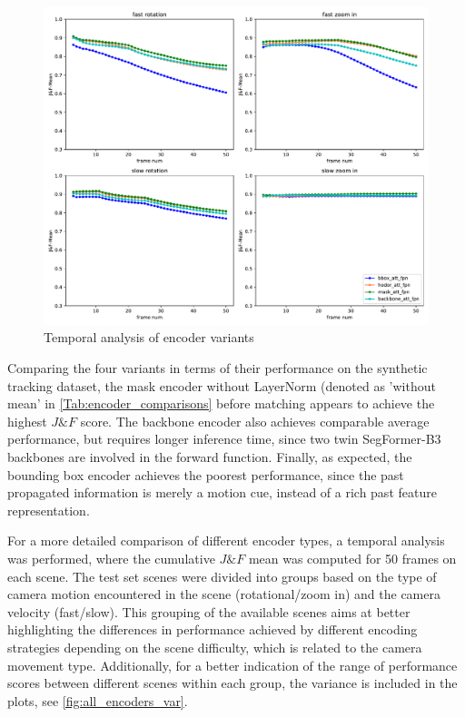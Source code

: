 \begin{figure} [ht!]
    \centering
    \includegraphics[width=1.\linewidth]{figures/04_experiments/encoder_ablations/bbox_att_fpn-hodor_att_fpn-mask_att_fpn-backbone_att_fpn-movement_all.pdf}
    \caption{Temporal analysis of encoder variants}
    \label{fig:all_encoders}
    
\end{figure}

Comparing the four variants in terms of their performance on the synthetic tracking dataset, the mask encoder without LayerNorm (denoted as 'without mean' in \tabref\ref{Tab:encoder_comparisons} before matching appears to achieve the highest $J\&F$ score. The backbone encoder also achieves comparable average performance, but requires longer inference time, since two twin SegFormer-B3 backbones are involved in the forward function. Finally, as expected, the bounding box encoder achieves the poorest performance, since the past propagated information is merely a motion cue, 
instead of a rich past feature representation. \par


For a more detailed comparison of different encoder types, a temporal analysis was performed, where the cumulative $J\&F$ mean was computed for 50 frames on each scene. The test set scenes were divided into groups based on the type of camera motion encountered in the scene (rotational/zoom in) and the camera velocity (fast/slow). This grouping of the available scenes aims at better highlighting the differences in performance achieved by different encoding strategies depending on the scene difficulty, which is related to the camera movement type. Additionally, for a better indication of the range of performance scores between different scenes within each group, the variance is included in the plots, see \figref\ref{fig:all_encoders_var}.\par



